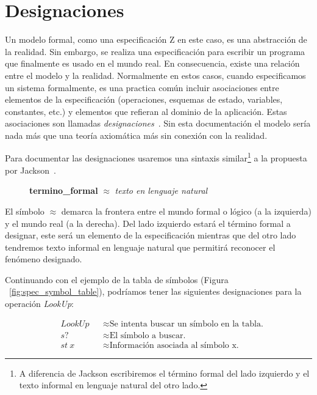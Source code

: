 \chapter{Designaciones}

Un modelo formal, como una especificación Z en este caso, es una abstracción de la realidad. Sin embargo, se realiza una especificación para escribir un programa que finalmente es usado en el mundo real. En consecuencia, existe una relación entre el modelo y la realidad.
Normalmente en estos casos, cuando especificamos un sistema formalmente, es una practica común incluir asociaciones entre elementos de la especificación (operaciones, esquemas de estado, variables, constantes, etc.) y elementos que refieran al dominio de la aplicación. Estas asociaciones son llamadas \emph{designaciones}~\cite{jackson}.
Sin esta documentación el modelo sería nada más que una teoría axiomática más sin conexión con la realidad. 

Para documentar las designaciones usaremos una sintaxis similar\footnote{A diferencia de Jackson escribiremos el término formal del lado izquierdo y el texto informal en lenguaje natural del otro lado.} a la propuesta por Jackson~\cite{jackson}.

\begin{figure}[H]
  \centering
  \textbf{termino\_formal} $\approx$ \emph{texto en lenguaje natural}
\end{figure}

El símbolo $\approx$ demarca la frontera entre el mundo formal o lógico (a la izquierda) y el mundo real (a la derecha). Del lado izquierdo estará el término formal a designar, este será un elemento de la especificación mientras que del otro lado tendremos texto informal en lenguaje natural que permitirá reconocer el fenómeno designado.

Continuando con el ejemplo de la tabla de símbolos (Figura ~\ref{fig:spec_symbol_table}), podríamos tener las siguientes designaciones para la operación \emph{LookUp}:

\begin{figure}[H]
  \begin{align*} 
    &LookUp && \approx \text{Se intenta buscar un símbolo en la tabla.} \\
    &s? && \approx \text{El símbolo a buscar.} \\
    &st~x && \approx \text{Información asociada al símbolo x.}
  \end{align*}
  \label{fig:ej_designacion}
\end{figure}

